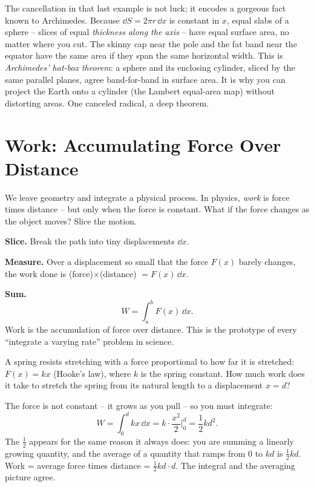 \begin{aestheticbox}
The cancellation in that last example is not luck; it encodes a gorgeous fact known
to Archimedes. Because $\dd S = 2\pi r\,\dd x$ is constant in $x$, equal slabs of a
sphere -- slices of equal \emph{thickness along the axis} -- have equal surface
area, no matter where you cut. The skinny cap near the pole and the fat band near
the equator have the same area if they span the same horizontal width. This is
\emph{Archimedes' hat-box theorem}: a sphere and its enclosing cylinder, sliced by
the same parallel planes, agree band-for-band in surface area. It is why you can
project the Earth onto a cylinder (the Lambert equal-area map) without distorting
areas. One canceled radical, a deep theorem.
\end{aestheticbox}

\section{Work: Accumulating Force Over Distance}
\label{ch26:work}

We leave geometry and integrate a physical process. In physics, \emph{work} is
force times distance -- but only when the force is constant. What if the force
changes as the object moves? Slice the motion.

\textbf{Slice.} Break the path into tiny displacements $\dd x$.

\textbf{Measure.} Over a displacement so small that the force $F(x)$ barely
changes, the work done is (force)$\times$(distance) $= F(x)\,\dd x$.

\textbf{Sum.}
\[
  \boxed{\,W = \int_a^b F(x)\,\dd x.\,}
\]
Work is the accumulation of force over distance. This is the prototype of every
``integrate a varying rate'' problem in science.

\begin{example}
\label{ch26:ex-spring}
A spring resists stretching with a force proportional to how far it is stretched:
$F(x) = kx$ (Hooke's law), where $k$ is the spring constant. How much work does it
take to stretch the spring from its natural length to a displacement $x=d$?

The force is not constant -- it grows as you pull -- so you must integrate:
\[
  W = \int_0^d kx\,\dd x = k\cdot\frac{x^2}{2}\Big|_0^d = \frac{1}{2}kd^2.
\]
The $\tfrac12$ appears for the same reason it always does: you are summing a
linearly growing quantity, and the average of a quantity that ramps from $0$ to
$kd$ is $\tfrac12 kd$. Work = average force times distance = $\tfrac12 kd\cdot d$.
The integral and the averaging picture agree.
\end{example}

